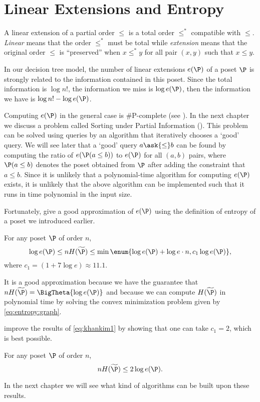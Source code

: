 \section{Linear Extensions and Entropy}

A linear extension of a partial order $\leq$ is a total order $\leq^*$
compatible with $\leq$. \emph{Linear} means that the order $\leq^*$ must be
total while \emph{extension} means that the original order $\leq$ is
``preserved'' \ie when \(x \leq^* y\) for all pair \((x,y)\) such that \(x
\leq y\).

In our decision tree model, the number of linear extensions $e(\P)$ of a poset
$\P$ is strongly related to the information contained in this poset. Since the
total information is $\log n!$, the information we miss is $\log e(\P)$, then
the information we have is $\log n! - \log e(\P)$.

Computing $e(\P)$ in the general case is \#P-complete
(see \citet*{brightwell1991counting}). In the next chapter we discuss a
problem called Sorting under Partial Information (\SUPI). This problem can be solved using \BigO{\ITLB}
queries by an algorithm that
iteratively chooses a `good' query. We will see later that a `good' query \(a \ask{\le} b\) can be
found by computing the ratio of \(e(\P(a \le b))\) to \(e(\P)\) for all \((a,b)\) pairs, where
\(\P(a \le b)\) denotes the poset obtained
from \(\P\) after adding the constraint that \(a \le b\).
Since it is unlikely that
a polynomial-time algorithm for computing \(e(\P)\) exists, it is unlikely that the above algorithm
can be implemented such that it runs in time polynomial in the input size.

Fortunately, \citet*{kahn:1995} give a good
approximation of $e(\P)$ using the definition of entropy of a poset we
introduced earlier.
\begin{theorem}
\label{eq:khankim1}
For any poset \(\P\) of order \(n\),
\begin{displaymath}
\log e(\P) \le n H(\widetilde{\P}) \le \min\enum{\log e(\P) + \log e \cdot n, c_1
\log e(\P)},
\end{displaymath}
where \(c_1 = (1 + 7 \log e) \approx 11.1\).
\end{theorem}

It is a good approximation because we have the guarantee that
\(n H(\widetilde{\P}) = \BigTheta{\log e(\P)}\) and because we can compute
\(H(\widetilde{\P})\) in polynomial time by solving the convex minimization
problem given by \ref{eq:entropy:graph}.

\citet*{cardinal:2013} improve the results of \ref{eq:khankim1} by showing that
one can take \(c_1 = 2\), which is best possible.
\begin{theorem}
For any poset \(\P\) of order \(n\),
\begin{displaymath}
n H(\widetilde{\P}) \le 2 \log e(\P).
\end{displaymath}
\end{theorem}

In the next chapter we will see what kind of algorithms can be built upon
these results.
